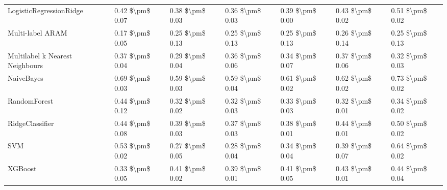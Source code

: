 \begin{tabular}{lllllll}
        LogisticRegressionRidge & 0.42 \$\textbackslash pm\$ 0.07 &           0.38 \$\textbackslash pm\$ 0.03 &       0.36 \$\textbackslash pm\$ 0.03 &        0.39 \$\textbackslash pm\$ 0.00 &                         0.43 \$\textbackslash pm\$ 0.02 & 0.51 \$\textbackslash pm\$ 0.02 \\
               Multi-label ARAM & 0.17 \$\textbackslash pm\$ 0.05 &           0.25 \$\textbackslash pm\$ 0.13 &       0.25 \$\textbackslash pm\$ 0.13 &        0.25 \$\textbackslash pm\$ 0.13 &                         0.26 \$\textbackslash pm\$ 0.14 & 0.25 \$\textbackslash pm\$ 0.13 \\
Multilabel k Nearest Neighbours & 0.37 \$\textbackslash pm\$ 0.04 &           0.29 \$\textbackslash pm\$ 0.04 &       0.36 \$\textbackslash pm\$ 0.06 &        0.34 \$\textbackslash pm\$ 0.07 &                         0.37 \$\textbackslash pm\$ 0.06 & 0.32 \$\textbackslash pm\$ 0.03 \\
                     NaiveBayes & 0.69 \$\textbackslash pm\$ 0.03 &           0.59 \$\textbackslash pm\$ 0.03 &       0.59 \$\textbackslash pm\$ 0.04 &        0.61 \$\textbackslash pm\$ 0.02 &                         0.62 \$\textbackslash pm\$ 0.02 & 0.73 \$\textbackslash pm\$ 0.02 \\
                   RandomForest & 0.44 \$\textbackslash pm\$ 0.12 &           0.32 \$\textbackslash pm\$ 0.02 &       0.32 \$\textbackslash pm\$ 0.03 &        0.33 \$\textbackslash pm\$ 0.03 &                         0.32 \$\textbackslash pm\$ 0.01 & 0.34 \$\textbackslash pm\$ 0.02 \\
                RidgeClassifier & 0.44 \$\textbackslash pm\$ 0.08 &           0.39 \$\textbackslash pm\$ 0.03 &       0.37 \$\textbackslash pm\$ 0.03 &        0.38 \$\textbackslash pm\$ 0.01 &                         0.44 \$\textbackslash pm\$ 0.01 & 0.50 \$\textbackslash pm\$ 0.02 \\
                            SVM & 0.53 \$\textbackslash pm\$ 0.02 &           0.27 \$\textbackslash pm\$ 0.05 &       0.28 \$\textbackslash pm\$ 0.04 &        0.34 \$\textbackslash pm\$ 0.04 &                         0.39 \$\textbackslash pm\$ 0.07 & 0.64 \$\textbackslash pm\$ 0.02 \\
                        XGBoost & 0.33 \$\textbackslash pm\$ 0.05 &           0.41 \$\textbackslash pm\$ 0.02 &       0.39 \$\textbackslash pm\$ 0.01 &        0.41 \$\textbackslash pm\$ 0.05 &                         0.43 \$\textbackslash pm\$ 0.01 & 0.44 \$\textbackslash pm\$ 0.04 \\
\bottomrule
\end{tabular}
